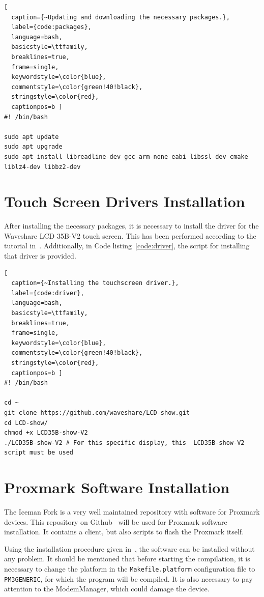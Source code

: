 \begin{lstlisting}[
  caption={~Updating and downloading the necessary packages.},
  label={code:packages},
  language=bash,
  basicstyle=\ttfamily,
  breaklines=true,
  frame=single, 
  keywordstyle=\color{blue},
  commentstyle=\color{green!40!black}, 
  stringstyle=\color{red},
  captionpos=b ]
#! /bin/bash

sudo apt update
sudo apt upgrade
sudo apt install libreadline-dev gcc-arm-none-eabi libssl-dev cmake liblz4-dev libbz2-dev
\end{lstlisting}


\section{Touch Screen Drivers Installation}

After installing the necessary packages, it is necessary to install the driver for the Waveshare LCD 35B-V2 touch screen. This has been performed according to the tutorial in~\cite{waveshare35inch}. Additionally, in Code listing~\ref{code:driver}, the script for installing that driver is provided.

\begin{lstlisting}[
  caption={~Installing the touchscreen driver.},
  label={code:driver},
  language=bash,
  basicstyle=\ttfamily,
  breaklines=true,
  frame=single, 
  keywordstyle=\color{blue},
  commentstyle=\color{green!40!black}, 
  stringstyle=\color{red},
  captionpos=b ]
#! /bin/bash

cd ~
git clone https://github.com/waveshare/LCD-show.git
cd LCD-show/
chmod +x LCD35B-show-V2
./LCD35B-show-V2 # For this specific display, this  LCD35B-show-V2 script must be used
\end{lstlisting}

\section{Proxmark Software Installation}

The Iceman Fork is a very well maintained repository with software for Proxmark devices. This repository on Github~\cite{githubproxmark} will be used for Proxmark software installation.  It contains a client, but also scripts to flash the Proxmark itself.

Using the installation procedure given in~\cite{githubproxmarkdoc}, the software can be installed without any problem. It should be mentioned that before starting the compilation, it is necessary to change the platform in the \texttt{Makefile.platform} configuration file to \texttt{PM3GENERIC}, for which the program will be compiled. It is also necessary to pay attention to the ModemManager, which could damage the device.

